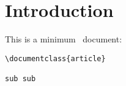 \section{Introduction}
This is a minimum \Dev\ document:
\begin{verbatim}
\documentclass{article}

sub sub

\end{verbatim}
